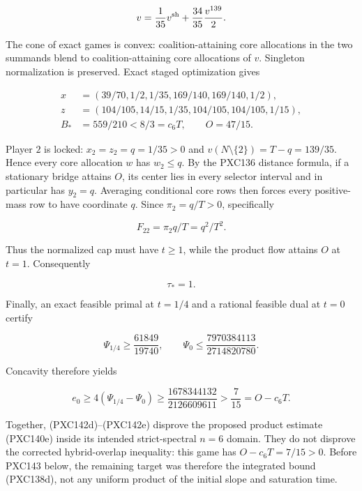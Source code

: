 \documentclass[11pt]{article}
\begin{document}
\[
 v=\frac1{35}v^{\rm sh}+\frac{34}{35}\frac{v^{139}}2.
\]

The cone of exact games is convex: coalition-attaining core allocations in
the two summands blend to coalition-attaining core allocations of \(v\).
Singleton normalization is preserved.  Exact staged optimization gives

\begin{equation}
\begin{split}
 x&=(39/70,1/2,1/35,169/140,169/140,1/2),\\
 z&=(104/105,14/15,1/35,104/105,104/105,1/15),\\
 B_*&=559/210<8/3=c_6T,\qquad O=47/15.
\end{split}                                             \tag{PXC142c}
\end{equation}

Player \(2\) is locked: \(x_2=z_2=q=1/35>0\) and
\(v(N\setminus\{2\})=T-q=139/35\).  Hence every core allocation \(w\)
has \(w_2\le q\).  By the PXC136 distance formula, if a stationary bridge
attains \(O\), its center lies in every selector interval and in particular
has \(y_2=q\).  Averaging conditional core rows then forces every
positive-mass row to have coordinate \(q\).  Since \(\pi_2=q/T>0\),
specifically

\[
 F_{22}=\pi_2q/T=q^2/T^2.
\]

Thus the normalized cap must have \(t\ge1\), while the product flow attains
\(O\) at \(t=1\).  Consequently

\begin{equation}
 \tau_*=1.                                               \tag{PXC142d}
\end{equation}

Finally, an exact feasible primal at \(t=1/4\) and a rational feasible dual
at \(t=0\) certify

\[
 \Psi_{1/4}\ge\frac{61849}{19740},\qquad
 \Psi_0\le\frac{7970384113}{2714820780}.
\]

Concavity therefore yields

\begin{equation}
 e_0\ge4(\Psi_{1/4}-\Psi_0)
 \ge\frac{1678344132}{2126609611}
 >\frac7{15}=O-c_6T.                                    \tag{PXC142e}
\end{equation}

Together, (PXC142d)--(PXC142e) disprove the proposed product estimate
(PXC140e) inside its intended strict-spectral \(n=6\) domain.  They do not
disprove the corrected hybrid-overlap inequality: this game has
\(O-c_6T=7/15>0\).  Before PXC143 below, the remaining target was therefore
the integrated bound (PXC138d), not any uniform product of the initial slope
and saturation time.
\end{document}
